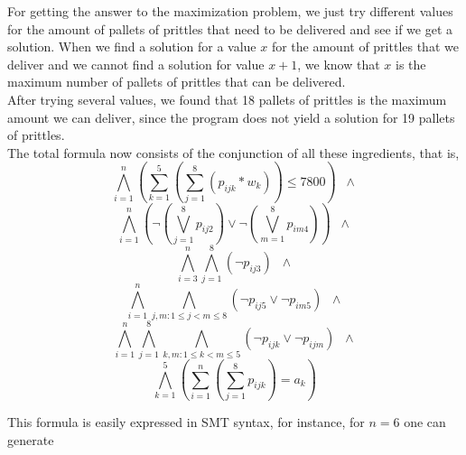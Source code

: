 \documentclass[a4paper]{article}
\begin{document}
For getting the answer to the maximization problem, we just try different values for the amount of pallets of prittles that need to be delivered and see if we get a solution. When we find a solution for a value $x$ for the amount of prittles that we deliver and we cannot find a solution for value $x+1$, we know that $x$ is the maximum number of pallets of prittles that can be delivered.\\

After trying several values, we found that 18 pallets of prittles is the maximum amount we can deliver, since the program does not yield a solution for 19 pallets of prittles.\\

The total formula now consists of the conjunction of all these ingredients, that is,
\[ \bigwedge_{i=1}^n (\sum_{k=1}^5 (\sum_{j=1}^8 (p_{ijk}*w_k)) \leq 7800) \;\; \wedge \]
\[ \bigwedge_{i=1}^n (\neg (\bigvee_{j=1}^8 p_{ij2}) \vee \neg (\bigvee_{m=1}^8 p_{im4})) \;\; \wedge \]
\[ \bigwedge_{i=3}^n \bigwedge_{j=1}^8 (\neg p_{ij3}) \;\; \wedge \]
\[ \bigwedge_{i=1}^n \bigwedge_{j,m:1 \leq j < m \leq 8} (\neg p_{ij5} \vee \neg p_{im5}) \;\; \wedge \]
\[ \bigwedge_{i=1}^n \bigwedge_{j=1}^8 \bigwedge_{k,m:1 \leq k < m \leq 5} (\neg p_{ijk} \vee \neg p_{ijm}) \;\; \wedge \]
\[ \bigwedge_{k=1}^5 ( \sum_{i=1}^n ( \sum_{j=1}^8 p_{ijk} ) = a_k) \]


This formula is easily expressed in SMT syntax, for instance, for $n=6$ one can generate
\end{document}
